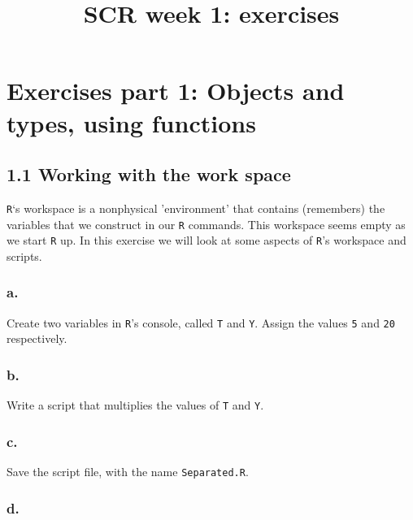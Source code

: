 \documentclass[]{article}
\title{SCR week 1: exercises}
\author{}
\date{}
\begin{document}
\maketitle

\hypertarget{exercises-part-1-objects-and-types-using-functions}{%
\section{Exercises part 1: Objects and types, using
functions}\label{exercises-part-1-objects-and-types-using-functions}}

\hypertarget{working-with-the-work-space}{%
\subsection{1.1 Working with the work
space}\label{working-with-the-work-space}}

\texttt{R}`s workspace is a nonphysical 'environment' that contains
(remembers) the variables that we construct in our \texttt{R} commands.
This workspace seems empty as we start \texttt{R} up. In this exercise
we will look at some aspects of \texttt{R}'s workspace and scripts.

\hypertarget{a.}{%
\subsubsection{a.}\label{a.}}

Create two variables in \texttt{R}'s console, called \texttt{T} and
\texttt{Y}. Assign the values \texttt{5} and \texttt{20} respectively.

\hypertarget{b.}{%
\subsubsection{b.}\label{b.}}

Write a script that multiplies the values of \texttt{T} and \texttt{Y}.

\hypertarget{c.}{%
\subsubsection{c.}\label{c.}}

Save the script file, with the name \texttt{Separated.R}.

\hypertarget{d.}{%
\subsubsection{d.}\label{d.}}
\end{document}
